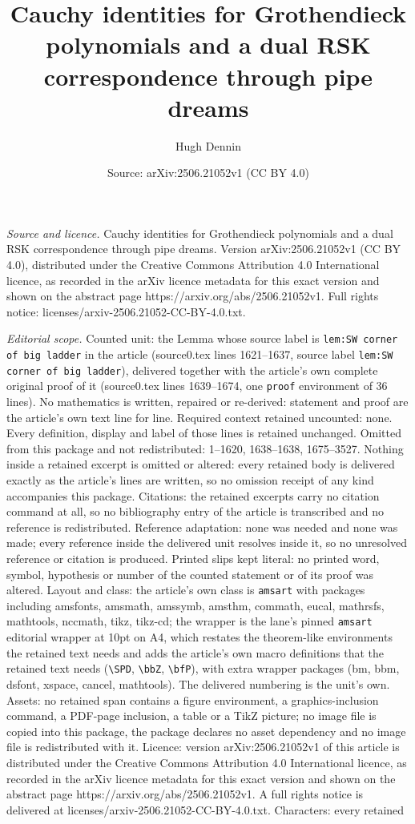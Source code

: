 \documentclass[10pt,a4paper]{amsart}
\title[Cauchy identities for Grothendieck polynomials and a dual RS]{Cauchy identities for Grothendieck polynomials and a dual RSK correspondence through pipe dreams}
\author{Hugh Dennin}
\date{Source: arXiv:2506.21052v1 (CC BY 4.0)}
\begin{document}
\maketitle

\noindent\emph{Source and licence.} Cauchy identities for Grothendieck polynomials and a dual RSK correspondence through pipe dreams. Version arXiv:2506.21052v1 (CC BY 4.0), distributed under the Creative Commons Attribution 4.0 International licence, as recorded in the arXiv licence metadata for this exact version and shown on the abstract page https://arxiv.org/abs/2506.21052v1. Full rights notice: licenses/arxiv-2506.21052-CC-BY-4.0.txt.\par\smallskip

\noindent\textit{Editorial scope.} Counted unit: the Lemma whose source label is \texttt{lem:SW corner of big ladder} in the article (source0.tex lines 1621--1637, source label \texttt{lem:SW corner of big ladder}), delivered together with the article's own complete original proof of it (source0.tex lines 1639--1674, one \texttt{proof} environment of 36 lines). No mathematics is written, repaired or re-derived: statement and proof are the article's own text line for line. Required context retained uncounted: none. Every definition, display and label of those lines is retained unchanged. Omitted from this package and not redistributed: 1--1620, 1638--1638, 1675--3527. Nothing inside a retained excerpt is omitted or altered: every retained body is delivered exactly as the article's lines are written, so no omission receipt of any kind accompanies this package. Citations: the retained excerpts carry no citation command at all, so no bibliography entry of the article is transcribed and no reference is redistributed. Reference adaptation: none was needed and none was made; every reference inside the delivered unit resolves inside it, so no unresolved reference or citation is produced. Printed slips kept literal: no printed word, symbol, hypothesis or number of the counted statement or of its proof was altered. Layout and class: the article's own class is \texttt{amsart} with packages including amsfonts, amsmath, amssymb, amsthm, commath, eucal, mathrsfs, mathtools, nccmath, tikz, tikz-cd; the wrapper is the lane's pinned \texttt{amsart} editorial wrapper at 10pt on A4, which restates the theorem-like environments the retained text needs and adds the article's own macro definitions that the retained text needs (\texttt{\textbackslash SPD}, \texttt{\textbackslash bbZ}, \texttt{\textbackslash bfP}), with extra wrapper packages (bm, bbm, dsfont, xspace, cancel, mathtools). The delivered numbering is the unit's own. Assets: no retained span contains a figure environment, a graphics-inclusion command, a PDF-page inclusion, a table or a TikZ picture; no image file is copied into this package, the package declares no asset dependency and no image file is redistributed with it. Licence: version arXiv:2506.21052v1 of this article is distributed under the Creative Commons Attribution 4.0 International licence, as recorded in the arXiv licence metadata for this exact version and shown on the abstract page https://arxiv.org/abs/2506.21052v1. A full rights notice is delivered at licenses/arxiv-2506.21052-CC-BY-4.0.txt. Characters: every retained 
\end{document}
